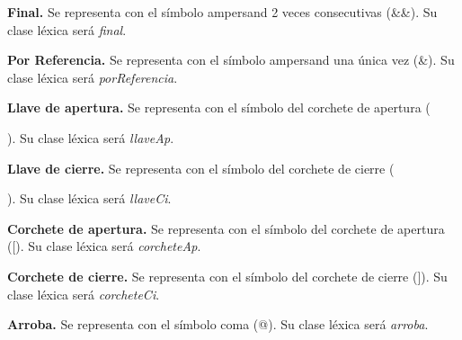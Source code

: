 \begin{itemize}
    \item \textbf{Final.} Se representa con el símbolo ampersand 2 veces consecutivas (\&\&). Su clase léxica será \textit{final}.
    \item \textbf{Por Referencia.} Se representa con el símbolo ampersand una única vez (\&). Su clase léxica será \textit{porReferencia}.
    \item \textbf{Llave de apertura.} Se representa con el símbolo del corchete de apertura ({). Su clase léxica será \textit{llaveAp}.
    \item \textbf{Llave de cierre.} Se representa con el símbolo del corchete de cierre (}). Su clase léxica será \textit{llaveCi}.
    \item \textbf{Corchete de apertura.} Se representa con el símbolo del corchete de apertura ([). Su clase léxica será \textit{corcheteAp}.
    \item \textbf{Corchete de cierre.} Se representa con el símbolo del corchete de cierre (]). Su clase léxica será \textit{corcheteCi}.
    \item \textbf{Arroba.} Se representa con el símbolo coma (@). Su clase léxica será \textit{arroba}.
\end{itemize}
